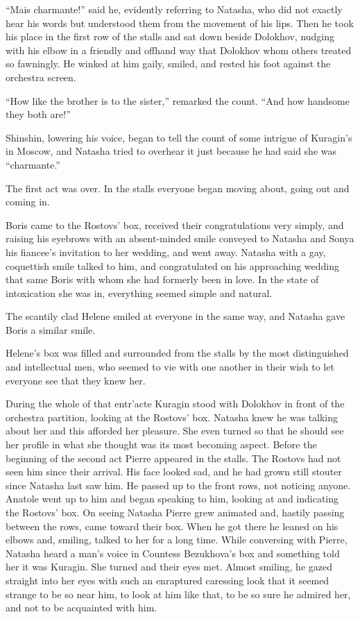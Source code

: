 ``Mais charmante!'' said he, evidently referring to Natasha, who
did not exactly hear his words but understood them from the
movement of his lips. Then he took his place in the first row of
the stalls and sat down beside Dolokhov, nudging with his elbow
in a friendly and offhand way that Dolokhov whom others treated
so fawningly. He winked at him gaily, smiled, and rested his foot
against the orchestra screen.

``How like the brother is to the sister,'' remarked the
count. ``And how handsome they both are!''

Shinshin, lowering his voice, began to tell the count of some
intrigue of Kuragin's in Moscow, and Natasha tried to overhear it
just because he had said she was ``charmante.''

The first act was over. In the stalls everyone began moving
about, going out and coming in.

Boris came to the Rostovs' box, received their congratulations
very simply, and raising his eyebrows with an absent-minded smile
conveyed to Natasha and Sonya his fiancee's invitation to her
wedding, and went away. Natasha with a gay, coquettish smile
talked to him, and congratulated on his approaching wedding that
same Boris with whom she had formerly been in love. In the state
of intoxication she was in, everything seemed simple and natural.

The scantily clad Helene smiled at everyone in the same way, and
Natasha gave Boris a similar smile.

Helene's box was filled and surrounded from the stalls by the
most distinguished and intellectual men, who seemed to vie with
one another in their wish to let everyone see that they knew her.

During the whole of that entr'acte Kuragin stood with Dolokhov in
front of the orchestra partition, looking at the Rostovs'
box. Natasha knew he was talking about her and this afforded her
pleasure. She even turned so that he should see her profile in
what she thought was its most becoming aspect. Before the
beginning of the second act Pierre appeared in the stalls. The
Rostovs had not seen him since their arrival. His face looked
sad, and he had grown still stouter since Natasha last saw him.
He passed up to the front rows, not noticing anyone. Anatole went
up to him and began speaking to him, looking at and indicating
the Rostovs' box. On seeing Natasha Pierre grew animated and,
hastily passing between the rows, came toward their box. When he
got there he leaned on his elbows and, smiling, talked to her for
a long time. While conversing with Pierre, Natasha heard a man's
voice in Countess Bezukhova's box and something told her it was
Kuragin. She turned and their eyes met. Almost smiling, he gazed
straight into her eyes with such an enraptured caressing look
that it seemed strange to be so near him, to look at him like
that, to be so sure he admired her, and not to be acquainted with
him.

